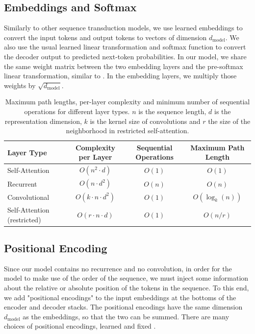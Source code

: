 \documentclass[conference]{IEEEtran}
\begin{document}
\subsection{Embeddings and Softmax}
Similarly to other sequence transduction models, we use learned embeddings to convert the input tokens and output tokens to vectors of dimension $d_{\text{model}}$. We also use the usual learned linear transformation and softmax function to convert the decoder output to predicted next-token probabilities. In our model, we share the same weight matrix between the two embedding layers and the pre-softmax linear transformation, similar to \cite{ref30}. In the embedding layers, we multiply those weights by $\sqrt{d_{\text{model}}}$.

\begin{table}[htbp]
\caption{Maximum path lengths, per-layer complexity and minimum number of sequential operations for different layer types. $n$ is the sequence length, $d$ is the representation dimension, $k$ is the kernel size of convolutions and $r$ the size of the neighborhood in restricted self-attention.}
\begin{center}
\begin{tabular}{|l|c|c|c|}
\hline
\textbf{Layer Type} & \textbf{Complexity per Layer} & \textbf{Sequential Operations} & \textbf{Maximum Path Length} \\
\hline
Self-Attention & $O(n^2 \cdot d)$ & $O(1)$ & $O(1)$ \\
Recurrent & $O(n \cdot d^2)$ & $O(n)$ & $O(n)$ \\
Convolutional & $O(k \cdot n \cdot d^2)$ & $O(1)$ & $O(\log_k(n))$ \\
Self-Attention (restricted) & $O(r \cdot n \cdot d)$ & $O(1)$ & $O(n/r)$ \\
\hline
\end{tabular}
\end{center}
\label{tab:1}
\end{table}

\subsection{Positional Encoding}
Since our model contains no recurrence and no convolution, in order for the model to make use of the order of the sequence, we must inject some information about the relative or absolute position of the tokens in the sequence. To this end, we add "positional encodings" to the input embeddings at the bottoms of the encoder and decoder stacks. The positional encodings have the same dimension $d_{\text{model}}$ as the embeddings, so that the two can be summed. There are many choices of positional encodings, learned and fixed \cite{ref9}.
\end{document}
